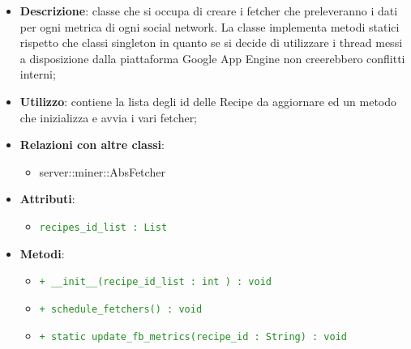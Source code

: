 			\begin{itemize}
				\item \textbf{Descrizione}: classe che si occupa di creare i fetcher che preleveranno i dati per ogni metrica di ogni social network. La classe implementa metodi statici rispetto che classi singleton in quanto se si decide di utilizzare i thread messi a disposizione dalla piattaforma Google App Engine non creerebbero conflitti interni;
				\item \textbf{Utilizzo}: contiene la lista degli id delle Recipe da aggiornare ed un metodo che inizializza e avvia i vari fetcher;
				\item \textbf{Relazioni con altre classi}:
					\begin{itemize}
						\item server::miner::AbsFetcher
					\end{itemize}
				\item \textbf{Attributi}:
					\begin{itemize}
						\item \textcolor{forestgreen}{\texttt{recipes\_id\_list : List}}
					\end{itemize}
				\item \textbf{Metodi}:   
					\begin{itemize}
						\item \textcolor{forestgreen}{\texttt{+ \_\_init\_\_(recipe\_id\_list : int ) : void}}
						\item \textcolor{forestgreen}{\texttt{+ schedule\_fetchers() : void}}
						\item \textcolor{forestgreen}{\texttt{+ static update\_fb\_metrics(recipe\_id : String) : void}}
						\begin{description}

\end{description}
\end{itemize}
\end{itemize}
